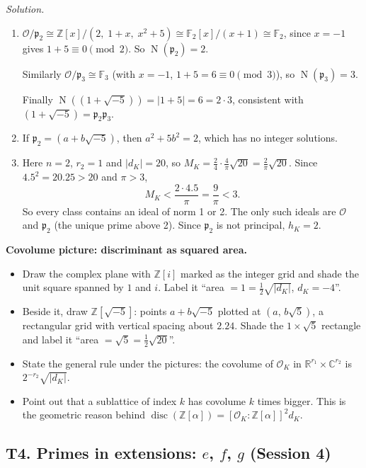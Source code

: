 \documentclass[11pt]{article}
\newcommand{\Z}{\mathbb{Z}}
\newcommand{\R}{\mathbb{R}}
\newcommand{\C}{\mathbb{C}}
\newcommand{\F}{\mathbb{F}}
\newcommand{\OK}{\mathcal{O}_K}
\newcommand{\cO}{\mathcal{O}}
\newcommand{\fp}{\mathfrak{p}}
\DeclareMathOperator{\Nm}{N}
\DeclareMathOperator{\disc}{disc}
\begin{document}
\begin{enumerate}[label=\textbf{Q3.\arabic*}]
  \textit{Solution.}
  \begin{enumerate}[label=(\alph*)]
    \item $\cO/\fp_2\cong\Z[x]/(2,\;1+x,\;x^2+5)\cong\F_2[x]/(x+1)\cong\F_2$, since $x=-1$ gives $1+5\equiv0\pmod 2$. So $\Nm(\fp_2)=2$.

    Similarly $\cO/\fp_3\cong\F_3$ (with $x=-1$, $1+5=6\equiv0\pmod 3$), so $\Nm(\fp_3)=3$.

    Finally $\Nm((1+\sqrt{-5}))=|1+5|=6=2\cdot3$, consistent with $(1+\sqrt{-5})=\fp_2\fp_3$.
    \item If $\fp_2=(a+b\sqrt{-5})$, then $a^2+5b^2=2$, which has no integer solutions.
    \item Here $n=2$, $r_2=1$ and $|d_K|=20$, so $M_K=\tfrac{2}{4}\cdot\tfrac{4}{\pi}\sqrt{20}=\tfrac{2}{\pi}\sqrt{20}$. Since $4.5^2=20.25>20$ and $\pi>3$,
    \[
    M_K<\frac{2\cdot4.5}{\pi}=\frac9\pi<3.
    \]
    So every class contains an ideal of norm 1 or 2. The only such ideals are $\cO$ and $\fp_2$ (the unique prime above 2). Since $\fp_2$ is not principal, $h_K=2$.
  \end{enumerate}
\end{enumerate}

\begin{instructornote}
\textbf{Covolume picture: discriminant as squared area.}
\begin{itemize}
  \item Draw the complex plane with $\Z[i]$ marked as the integer grid and shade the unit square spanned by $1$ and $i$. Label it ``area $=1=\tfrac12\sqrt{|d_K|}$, $d_K=-4$''.
  \item Beside it, draw $\Z[\sqrt{-5}]$: points $a+b\sqrt{-5}$ plotted at $(a,\,b\sqrt5)$, a rectangular grid with vertical spacing about $2.24$. Shade the $1\times\sqrt5$ rectangle and label it ``area $=\sqrt5=\tfrac12\sqrt{20}$''.
  \item State the general rule under the pictures: the covolume of $\OK$ in $\R^{r_1}\times\C^{r_2}$ is $2^{-r_2}\sqrt{|d_K|}$.
  \item Point out that a sublattice of index $k$ has covolume $k$ times bigger. This is the geometric reason behind $\disc(\Z[\alpha])=[\OK:\Z[\alpha]]^2d_K$.
\end{itemize}
\end{instructornote}

\subsection{T4. Primes in extensions: \texorpdfstring{$e$, $f$, $g$}{e, f, g} (Session 4)}
\end{document}
